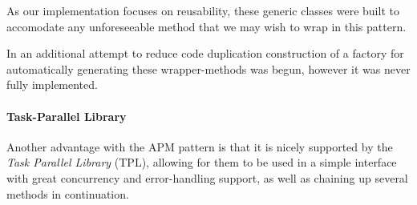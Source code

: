 As our implementation focuses on reusability, these generic classes were built to accomodate any
unforeseeable method that we may wish to wrap in this pattern.

In an additional attempt to reduce code duplication construction of a factory for automatically
generating these wrapper-methods was begun, however it was never fully implemented.

\paragraph{Task-Parallel Library}

Another advantage with the APM pattern is that it is nicely supported by the \emph{Task Parallel Library}\cite[p.~656]{Griffiths2010}
(TPL), allowing for them to be used in a simple interface with great concurrency and error-handling support, as well as chaining up
several methods in continuation.
